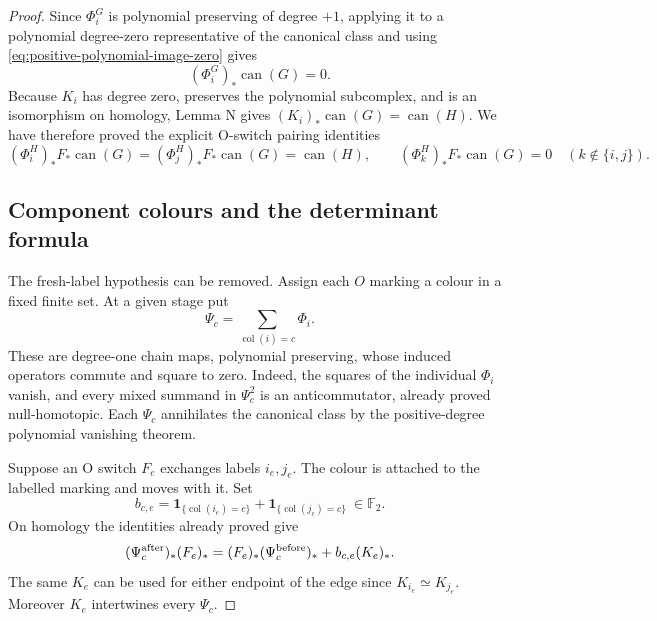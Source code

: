\documentclass[11pt,a4paper]{article}
\theoremstyle{remark}
\begin{document}
\begin{proof}
Since $\Phi_i^G$ is polynomial preserving of degree $+1$, applying it to
a polynomial degree-zero representative of the canonical class and using
\eqref{eq:positive-polynomial-image-zero} gives
\[
 (\Phi_i^G)_*\operatorname{can}(G)=0.
\]
Because $K_i$ has degree zero, preserves the polynomial subcomplex, and
is an isomorphism on homology, Lemma N gives
$(K_i)_*\operatorname{can}(G)=\operatorname{can}(H)$.  We have therefore
proved the explicit O-switch pairing identities
\begin{equation}\label{eq:O-switch-top-pairing}
 (\Phi_i^H)_*F_*\operatorname{can}(G)
 =(\Phi_j^H)_*F_*\operatorname{can}(G)=\operatorname{can}(H),
 \qquad
 (\Phi_k^H)_*F_*\operatorname{can}(G)=0\quad(k\notin\{i,j\}).
\end{equation}

\subsection{Component colours and the determinant formula}

The fresh-label hypothesis can be removed.  Assign each $O$ marking a
colour in a fixed finite set.  At a given stage put
\[
 \Psi_c=\sum_{\operatorname{col}(i)=c}\Phi_i.
\]
These are degree-one chain maps, polynomial preserving, whose induced
operators commute and square to zero.  Indeed, the squares of the
individual $\Phi_i$ vanish, and every mixed summand in $\Psi_c^2$ is an
anticommutator, already proved null-homotopic.  Each $\Psi_c$ annihilates
the canonical class by the positive-degree polynomial vanishing theorem.

Suppose an O switch $F_e$ exchanges labels $i_e,j_e$.  The colour is
attached to the labelled marking and moves with it.  Set
\[
 b_{c,e}=\mathbf1_{\{\operatorname{col}(i_e)=c\}}
          +\mathbf1_{\{\operatorname{col}(j_e)=c\}}
          \ \in\mathbb F_2.
\]
On homology the identities already proved give
\begin{equation}\label{eq:colour-switch-commutator}
 (\Psi_c^{\rm after})_* (F_e)_*
 =(F_e)_*(\Psi_c^{\rm before})_*+b_{c,e}(K_e)_*.
\end{equation}
The same $K_e$ can be used for either endpoint of the edge since
$K_{i_e}\simeq K_{j_e}$.  Moreover $K_e$ intertwines every $\Psi_c$.


\end{proof}
\end{document}
